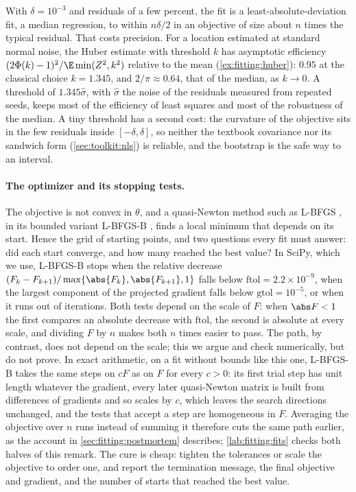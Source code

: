 \begin{refsection}
With $\delta=10^{-3}$ and residuals of a few percent, the fit is a least-absolute-deviation fit, a median regression, to within $n\delta/2$ in an objective of size about $n$ times the typical residual. That costs precision. For a location estimated at standard normal noise, the Huber estimate with threshold $k$ has asymptotic efficiency $(2\Phi(k)-1)^2/\E\min(Z^2,k^2)$ relative to the mean (\cref{ex:fitting:huber}): $0.95$ at the classical choice $k=1.345$, and $2/\pi\approx0.64$, that of the median, as $k\to0$. A threshold of $1.345\hat\sigma$, with $\hat\sigma$ the noise of the residuals measured from repeated seeds, keeps most of the efficiency of least squares and most of the robustness of the median. A tiny threshold has a second cost: the curvature of the objective sits in the few residuals inside $[-\delta,\delta]$, so neither the textbook covariance nor its sandwich form (\cref{sec:toolkit:nls}) is reliable, and the bootstrap is the safe way to an interval.

\paragraph{The optimizer and its stopping tests.} The objective is not convex in $\theta$, and a quasi-Newton method such as L-BFGS \parencite{Nocedal1980}, in its bounded variant L-BFGS-B \parencite{ByrdEtAl1995}, finds a local minimum that depends on its start. Hence the grid of starting points, and two questions every fit must answer: did each start converge, and how many reached the best value? In SciPy, which we use, L-BFGS-B stops when the relative decrease $(F_k-F_{k+1})/\max\{\abs{F_k},\abs{F_{k+1}},1\}$ falls below $\mathrm{ftol}=2.2\times10^{-9}$, when the largest component of the projected gradient falls below $\mathrm{gtol}=10^{-5}$, or when it runs out of iterations. Both tests depend on the scale of $F$: when $\abs F<1$ the first compares an absolute decrease with $\mathrm{ftol}$, the second is absolute at every scale, and dividing $F$ by $n$ makes both $n$ times easier to pass. The path, by contrast, does not depend on the scale; this we argue and check numerically, but do not prove. In exact arithmetic, on a fit without bounds like this one, L-BFGS-B takes the same steps on $cF$ as on $F$ for every $c>0$: its first trial step has unit length whatever the gradient, every later quasi-Newton matrix is built from differences of gradients and so scales by $c$, which leaves the search directions unchanged, and the tests that accept a step are homogeneous in $F$. Averaging the objective over $n$ runs instead of summing it therefore cuts the same path earlier, as the account in \cref{sec:fitting:postmortem} describes; \cref{lab:fitting:fits} checks both halves of this remark. The cure is cheap: tighten the tolerances or scale the objective to order one, and report the termination message, the final objective and gradient, and the number of starts that reached the best value.


\end{refsection}
